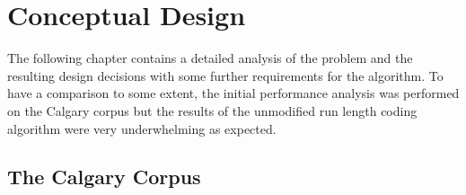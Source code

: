 
\chapter{Conceptual Design}
\label{ch:Analysis}

\par{
The following chapter contains a detailed analysis of the problem and the resulting design decisions with some further requirements for the algorithm. To have a comparison to some extent, the initial performance analysis was performed on the Calgary corpus but the results of the unmodified run length coding algorithm were very underwhelming as expected.
}

\section{The Calgary Corpus}
